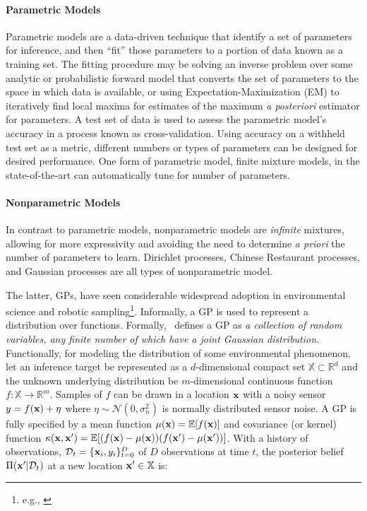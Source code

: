 \paragraph{Parametric Models}
Parametric models are a data-driven technique that identify a set of parameters for inference, and then ``fit'' those parameters to a portion of data known as a training set. The fitting procedure may be solving an inverse problem over some analytic or probabilistic forward model that converts the set of parameters to the space in which data is available\autocite{puonti2016fast}, or using Expectation-Maximization (EM) to iteratively find local maxima for estimates of the maximum \emph{a posteriori} estimator for parameters\autocite{moon1996expectation}. A test set of data is used to assess the parametric model's accuracy in a process known as cross-validation. Using accuracy on a withheld test set as a metric, different numbers or types of parameters can be designed for desired performance. One form of parametric model, finite mixture models\autocite{figueiredo2002unsupervised}, in the state-of-the-art can automatically tune for number of parameters.

\paragraph{Nonparametric Models}
In contrast to parametric models, nonparametric models are \emph{infinite} mixtures, allowing for more expressivity and avoiding the need to determine \emph{a priori} the number of parameters to learn. Dirichlet processes\autocite{ferguson1973bayesian}, Chinese Restaurant processes\autocite{griffiths2003hierarchical}, and Gaussian processes\autocite{Rasmussen2004} are all types of nonparametric model. 

The latter, GPs, have seen considerable widespread adoption in environmental science and robotic sampling\footnote{e.g., \autocite{Srinivas2012,krause2008near,ouyang2014multi,kleiber2012daily,cahill2015modeling,wan2017reduced, ma2017informative, Marchant2014a,flaspohler2019information,luo2018adaptive,guestrin2005near}}. Informally, a GP is used to represent a distribution over functions. Formally,~\cite{Rasmussen2004} defines a GP as \emph{a collection of random variables, any finite number of which have a joint Gaussian distribution.} Functionally, for modeling the distribution of some environmental phenomenon, let an inference target be represented as a $d$-dimensional compact set $\mathbb{X} \subset \mathbb{R}^d$ and the unknown underlying distribution be $m$-dimensional continuous function $f : \mathbb{X} \longrightarrow \mathbb{R}^m$. Samples of $f$ can be drawn in a location $\mathbf{x}$ with a noisy sensor $y = f(\mathbf{x}) + \eta$ where $\eta \sim \mathcal{N}(0, \sigma_n^2)$ is normally distributed sensor noise. A GP is fully specified by a mean function $\mu(\mathbf{x}) = \mathbb{E}[f(\mathbf{x})]$ and covariance (or kernel) function $\kappa(\mathbf{x},\mathbf{x}') = \mathbb{E}[(f(\mathbf{x}) - \mu(\mathbf{x}))(f(\mathbf{x}') - \mu(\mathbf{x}'))]$. With a history of observations, $\mathcal{D}_t = \{\mathbf{x}_i, y_i\}_{t=0}^D$ of $D$ observations at time $t$, the posterior belief $\Pi(\mathbf{x}' | \mathcal{D}_t)$ at a new location $\mathbf{x}' \in \mathbb{X}$ is:

